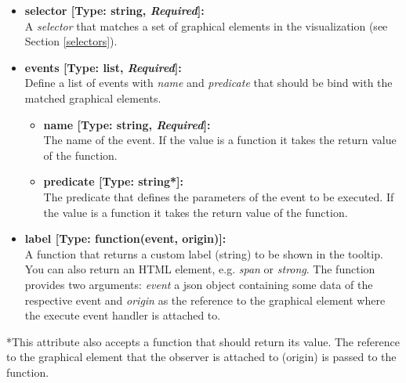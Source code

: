 \begin{itemize}

\item[] \textbf{selector [Type: string, \textit{Required}]:}\\ A \textit{selector} that matches a set of graphical elements in the visualization (see Section \ref{selectors}).

\item[] \textbf{events [Type: list, \textit{Required}]:}\\
Define a list of events with \textit{name} and \textit{predicate} that should be bind with the matched graphical elements.

\begin{itemize}

\item[] \textbf{name [Type: string, \textit{Required}]:}\\
The name of the event. 
If the value is a function it takes the return value of the function.

\item[] \textbf{predicate [Type: string*]:}\\
The predicate that defines the parameters of the event to be executed.
If the value is a function it takes the return value of the function.

\end{itemize}

\item[] \textbf{label [Type: function(event, origin)]:}\\
A function that returns a custom label (string) to be shown in the tooltip.
You can also return an HTML element, e.g. \textit{span} or \textit{strong}.
 The function provides two arguments: \textit{event} a json object containing some data of the respective event and \textit{origin} as the reference to the graphical element where the execute event handler is attached to.
	
\end{itemize}

*This attribute also accepts a function that should return its value.
The reference to the graphical element that the observer is attached to (origin) is passed to the function.

